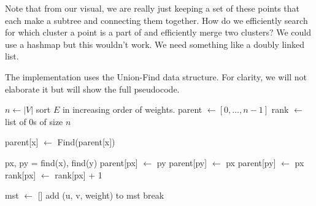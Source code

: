 \documentclass{article}
\begin{document}
      Note that from our visual, we are really just keeping a set of these points that each make a subtree and connecting them together. How do we efficiently search for which cluster a point is a part of and efficiently merge two clusters? We could use a hashmap but this wouldn't work. We need something like a doubly linked list. 

      \begin{algo}
        The implementation uses the Union-Find data structure. For clarity, we will not elaborate it but will show the full pseudocode. 
        \begin{algorithm}[H]
          \label{alg:kruskal}
          \begin{algorithmic}
            \State 
              \State $n \gets |V|$ 
              \State sort $E$ in increasing order of weights. 
              \State parent $\gets [0, \ldots, n-1]$ 
              \State rank $\gets$ list of $0$s of size $n$ 

                \State parent[x] $\gets$ Find(parent[x]) 
                \EndIf
                \State {}
              \EndFunction

                \State px, py = find(x), find(y) 
                  \State {}
                \EndIf
                  \State parent[px] $\gets$ py
                  \State parent[py] $\gets$ px
                \Else{}
                  \State parent[py] $\gets$ px 
                  \State rank[px] $\gets$ rank[px] + 1
                \EndIf
                \State {}
              \EndFunction

              \State mst $\gets$ [] 
                  \State add (u, v, weight) to mst
                \EndIf 
                  \State break
                \EndIf 
              \EndFor

              \State {}
            \EndFunction
          \end{algorithmic}
        \end{algorithm}
      \end{algo}
      
\end{document}
